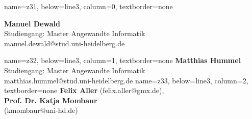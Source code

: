 \documentclass[portrait,a0paper]{baposter}
\begin{document}
\begin{poster}
{ }



 {}

    {
    name=z31,
    below=line3,
    column=0,
    textborder=none
    }
    {
    \textsf{\textbf{Manuel Dewald}\\
    Studiengang: Master Angewandte Informatik\\
	manuel.dewald@stud.uni-heidelberg.de
	}

 }
  \headerbox{}
    {
    name=z32,
    below=line3,
    column=1,
    textborder=none
    }
    {
    \textsf{\textbf{Matthias Hummel}\\
    	Studiengang: Master Angewandte Informatik\\
	matthias.hummel@stud.uni-heidelberg.de 
	}
 }
    {
    name=z33,
    below=line3,
    column=2,
    textborder=none
    }
    {
    \textsf{\textbf{Felix Aller} (felix.aller@gmx.de),\\
    \textbf{Prof. Dr. Katja Mombaur}\\(kmombaur@uni-hd.de)}
  }


\end{poster}
\end{document}
